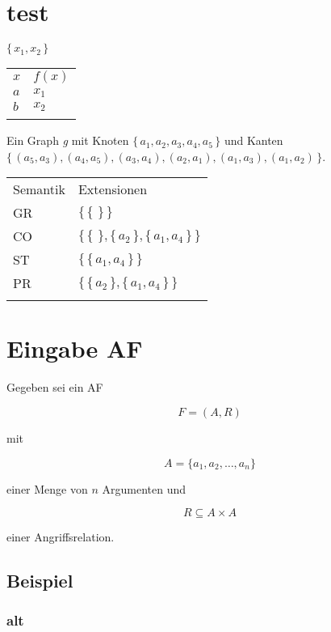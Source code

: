 \documentclass[]{article}
\begin{document}
\section{test}\label{test}

$\{\,x_1,x_2\,\} $

\begin{longtable}[c]{@{}ll@{}}
\toprule\addlinespace
$x$ & $f(x)$
\\\addlinespace
\midrule\endhead
$a$ & $x_1$
\\\addlinespace
$b$ & $x_2$
\\\addlinespace
\bottomrule
\end{longtable}

Ein Graph \emph{g} mit Knoten $\{\,a_1,a_2,a_3,a_4,a_5\,\} $ und Kanten
$\{\,(a_5,a_3),(a_4,a_5),(a_3,a_4),(a_2,a_1),(a_1,a_3),(a_1,a_2)\,\} $.

\begin{longtable}[c]{@{}ll@{}}
\toprule\addlinespace
Semantik & Extensionen
\\\addlinespace
\midrule\endhead
GR & $\{\,\{\,\,\}\,\} $
\\\addlinespace
CO & $\{\,\{\,\,\},\{\,a_2\,\},\{\,a_1,a_4\,\}\,\} $
\\\addlinespace
ST & $\{\,\{\,a_1,a_4\,\}\,\} $
\\\addlinespace
PR & $\{\,\{\,a_2\,\},\{\,a_1,a_4\,\}\,\} $
\\\addlinespace
\bottomrule
\end{longtable}

\section{Eingabe AF}\label{eingabe-af}

Gegeben sei ein AF

\[ F = (A,R) \]

mit

\[ A = \{a_1,a_2,\dots,a_n\} \]

einer Menge von $n$ Argumenten und

\[ R \subseteq A \times A \]

einer Angriffsrelation.

\subsection{Beispiel}\label{beispiel}

\subsubsection{alt}\label{alt}
\end{document}
